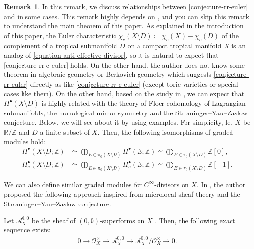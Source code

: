 \documentclass[a4paper,dvipdfmx,reqno,12pt]{amsart}
\theoremstyle{definition}
\newtheorem{remark}[theorem]{Remark}
\newcommand{\deq}{\coloneqq}
\numberwithin{equation}{section}
\begin{document}
\begin{remark}
\label{remark-c-infinity-divisor}
In this remark, we discuss relationships
between \cref{conjecture-rr-euler} and 
\cite{tsutsui2023graded} in some cases.
This remark highly depends on
\cite{tsutsui2023graded}, and you can
skip this remark to understand the main theorem of  
this paper. As explained in the introduction of this paper,
the Euler characteristic 
$\chi_c(X\setminus D)\deq \chi_c(X)-\chi_c(D)$ of 
the complement of a tropical submanifold $D$ on
a compact tropical manifold $X$ is an analog of  
\cref{equation-anti-effective-divisor}, so 
it is natural to expect that \cref{conjecture-rr-c-euler} holds.
On the other hand, the author does not know some theorem
in algebraic geometry or Berkovich geometry
which suggests \cref{conjecture-rr-euler} directly
as like \cref{conjecture-rr-c-euler}
(except toric varieties or special cases like them).
On the other hand, based on the study in \cite{tsutsui2023graded},
we can expect that 
$H^{\bullet}(X\setminus D)$ is highly related with
the theory of Floer cohomology of
Lagrangian submanifolds, the homological mirror symmetry
and the Strominger--Yau--Zaslow conjecture.
Below, we will see about it by using examples. 
For simplicity, let 
$X$ be $\mathbb{R}/\mathbb{Z}$ and $D$ a finite subset of
$X$. Then, the following isomorphisms of graded modules hold:
\begin{align}
H^{\bullet}(X\setminus D;\mathbb{Z}) 
&\simeq \bigoplus_{E\in \pi_0(X\setminus D)} 
H^{\bullet}(E;\mathbb{Z})
\simeq \bigoplus_{E\in \pi_0(X\setminus D)} \mathbb{Z}[0], \\
H_c^{\bullet}(X\setminus D;\mathbb{Z}) 
&\simeq \bigoplus_{E\in \pi_0(X\setminus D)} 
H^{\bullet}_c(E;\mathbb{Z})
\simeq \bigoplus_{E\in \pi_0(X\setminus D)} \mathbb{Z}[-1].
\end{align}

We can also define similar graded modules
for $C^{\infty}$-divisors on $X$.
In \cite{tsutsui2023graded},
the author proposed the following approach
inspired from microlocal sheaf theory and
the Strominger--Yau--Zaslow conjecture.

Let $\mathcal{A}^{0,0}_X$ be the sheaf of
$(0,0)$-superforms on $X$
\cite[Definition 2.24]{MR3903579}.
Then, the following exact sequence exists:
\begin{align}
0\to \mathcal{O}_X^{\times} \to \mathcal{A}^{0,0}_X
\to \mathcal{A}^{0,0}_X/\mathcal{O}_X^{\times} \to 0.
\end{align}


\end{remark}
\end{document}
